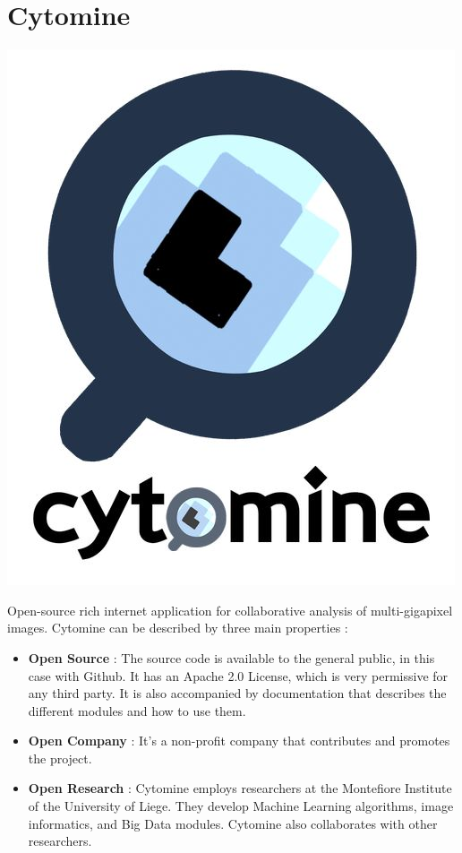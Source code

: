 \documentclass[a4paper,11pt]{report}
\numberwithin{figure}{section} %
\begin{document}
\section{Cytomine}


\begin{center}
    \includegraphics[scale=0.80]{images/logo_cytomine.jpg}
\end{center}

Open-source rich internet application for collaborative analysis of multi-gigapixel images.
Cytomine can be described by three main properties :
\begin{itemize}
\item[\textbullet] \textbf{Open Source} : The source code is available to the general public, in this case with Github.
It has an Apache 2.0 License, which is very permissive for any third party.
It is also accompanied by documentation that describes the different modules and how to use them.
\item[\textbullet] \textbf{Open Company} : It's a non-profit company that contributes and promotes the project.
\item[\textbullet] \textbf{Open Research} : Cytomine employs researchers at the Montefiore Institute of the University of Liege.
They develop Machine Learning algorithms, image informatics, and Big Data modules.
Cytomine also collaborates with other researchers.
\end{itemize}
\end{document}
